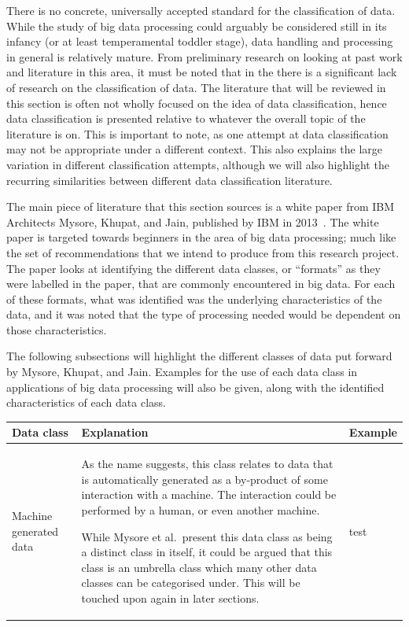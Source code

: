 \documentclass[a4paper,11pt]{article}
\begin{document}
There is no concrete, universally accepted standard for the classification of data. While the study of big data processing
could arguably be considered still in its infancy (or at least temperamental toddler stage), data handling and processing
in general is relatively mature. From preliminary research on looking at past work and literature in this area,
it must be noted that in the there is a significant lack of research on the classification of data. The literature that
will be reviewed in this section is often not wholly focused on the idea of data classification, hence data classification
is presented relative to whatever the overall topic of the literature is on. This is important to note, as one attempt
at data classification may not be appropriate under a different context. This also explains the large variation in different
classification attempts, although we will also highlight the recurring similarities between different data classification
literature.

The main piece of literature that this section sources is a white paper from IBM Architects Mysore, Khupat, and Jain,
published by IBM in 2013~\cite{ibm_big_2013}. The white paper is targeted towards beginners in the area of big data
processing; much like the set of recommendations that we intend to produce from this research project. The paper looks
at identifying the different data classes, or ``formats'' as they were labelled in the paper, that are commonly
encountered in big data. For each of these formats, what was identified was the underlying characteristics of the data,
and it was noted that the type of processing needed would be dependent on those characteristics.

The following subsections will highlight the different classes of data put forward by Mysore, Khupat, and Jain.
Examples for the use of each data class in applications of big data processing will also be given, along with the
identified characteristics of each data class.

\hspace*{-3cm}
\begingroup
\fontsize{10pt}{10pt}\selectfont
\begin{tabular}{ | p{1.5cm} | p{8cm} | p{8cm} | }
  \hline
  \textbf{Data class}          &  \textbf{Explanation} & \textbf{Example}   \\ \hline
  Machine generated data       &  As the name suggests, this class relates to data that is automatically generated as a
  by-product of some interaction with a machine. The interaction could be performed by a human, or even another machine.

  While Mysore et al.\ present this data class as being a distinct class in itself, it could be argued that this class
  is an umbrella class which many other data classes can be categorised under. This will be touched upon again in later
  sections. & test \\ \hline


\end{tabular}
\endgroup
\hspace*{-3cm}
\end{document}

